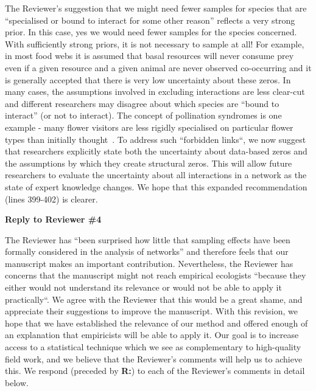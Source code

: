 \documentclass[12pt]{letter}
\begin{document}
		The Reviewer's suggestion that we might need fewer samples for species that are ``specialised or bound to interact for some other reason'' reflects a very strong prior. In this case, yes we would need fewer samples for the species concerned. With sufficiently strong priors, it is not necessary to sample at all! For example, in most food webs it is assumed that basal resources will never consume prey even if a given resource and a given animal are never observed co-occurring and it is generally accepted that there is very low uncertainty about these zeros. In many cases, the assumptions involved in excluding interactions are less clear-cut and different researchers may disagree about which species are ``bound to interact'' (or not to interact). The concept of pollination syndromes is one example - many flower visitors are less rigidly specialised on particular flower types than initially thought~\citep{Ollerton2009}. To address such ``forbidden links``, we now suggest that researchers explicitly state both the uncertainty about data-based zeros and the assumptions by which they create structural zeros. This will allow future researchers to evaluate the uncertainty about all interactions in a network as the state of expert knowledge changes. We hope that this expanded recommendation (lines 399-402) is clearer.


\clearpage

{\Large \bf Reply to Reviewer \#4}


	The Reviewer has ``been surprised how little that sampling effects have been formally considered in the analysis of networks'' and therefore feels that our manuscript makes an important contribution. Nevertheless, the Reviewer has concerns that the manuscript might not reach empirical ecologists ``because they either would not understand its relevance or would not be able to apply it practically``. We agree with the Reviewer that this would be a great shame, and appreciate their suggestions to improve the manuscript. With this revision, we hope that we have established the relevance of our method and offered enough of an explanation that empiricists will be able to apply it. Our goal is to increase access to a statistical technique which we see as complementary to high-quality field work, and we believe that the Reviewer's comments will help us to achieve this. We respond (preceded by \textbf{R:}) to each of the Reviewer's comments in detail below.
\end{document}
